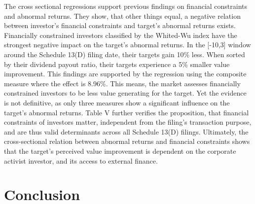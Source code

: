 \documentclass[12pt]{article}
\begin{document}
The cross sectional regressions support previous findings on financial constraints and abnormal returns. They show, that other things equal, a negative relation between investor's financial constraints and target's abnormal returns exists. Financially constrained investors classified by the Whited-Wu index have the strongest negative impact on the target's abnormal returns. In the [-10,3] window around the Schedule 13(D) filing date, their targets gain 10\% less. When sorted by their dividend payout ratio, their targets experience a 5\% smaller value improvement. This findings are supported by the regression using the composite measure where the effect is 8.96\%. This means, the market assesses financially constrained investors to be less value generating for the target. Yet the evidence is not definitive, as only three measures show a significant influence on the target's abnormal returns. Table V further verifies the proposition, that financial constraints of investors matter, independent from the filing's transaction purpose, and are thus valid determinants across all Schedule 13(D) filings. Ultimately, the cross-sectional relation between abnormal returns and financial constraints shows that the target's perceived value improvement is dependent on the corporate activist investor, and its access to external finance.
\pagebreak
\section{Conclusion}
\end{document}
